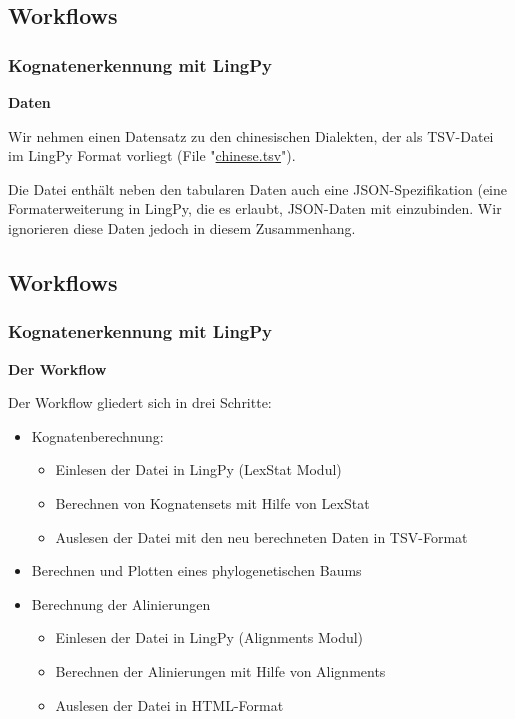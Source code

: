 \subsection{\texorpdfstring{{Workflows}}{Workflows}}

\subsubsection{\texorpdfstring{{Kognatenerkennung mit
LingPy}}{Kognatenerkennung mit LingPy}}

\textbf{Daten}

Wir nehmen einen Datensatz zu den chinesischen Dialekten, der als
TSV-Datei im LingPy Format vorliegt (File
"\href{https://github.com/LinguList/pyjs-seminar/blob/master/website/code/data/chinese.tsv}{chinese.tsv}").

Die Datei enthält neben den tabularen Daten auch eine JSON-Spezifikation
(eine Formaterweiterung in LingPy, die es erlaubt, JSON-Daten mit
einzubinden. Wir ignorieren diese Daten jedoch in diesem Zusammenhang.

\subsection{\texorpdfstring{{Workflows}}{Workflows}}

\subsubsection{\texorpdfstring{{Kognatenerkennung mit
LingPy}}{Kognatenerkennung mit LingPy}}

\textbf{Der Workflow}

Der Workflow gliedert sich in drei Schritte:

\begin{itemize}
\itemsep1pt\parskip0pt
\item
  Kognatenberechnung:

  \begin{itemize}
  \itemsep1pt\parskip0pt
  \item
    Einlesen der Datei in LingPy (LexStat Modul)
  \item
    Berechnen von Kognatensets mit Hilfe von LexStat
  \item
    Auslesen der Datei mit den neu berechneten Daten in TSV-Format
  \end{itemize}
\item
  Berechnen und Plotten eines phylogenetischen Baums
\item
  Berechnung der Alinierungen

  \begin{itemize}
  \itemsep1pt\parskip0pt
  \item
    Einlesen der Datei in LingPy (Alignments Modul)
  \item
    Berechnen der Alinierungen mit Hilfe von Alignments
  \item
    Auslesen der Datei in HTML-Format
  \end{itemize}
\end{itemize}

